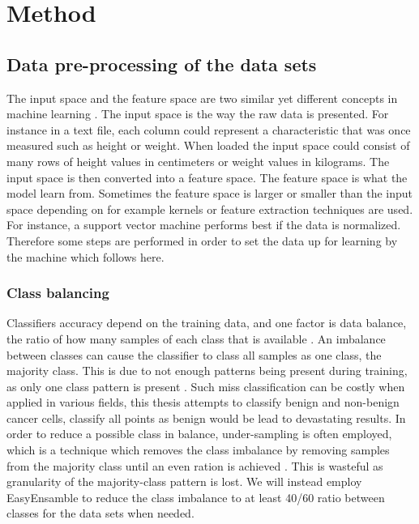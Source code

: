 \documentclass[a4paper,twoside]{bth}
\begin{document}
\chapter{Method}

\section{Data pre-processing of the data sets}

The input space and the feature space are two similar yet different concepts in machine learning \cite{Flach:2012:MLA:2490546}. The input space is the way the raw data is presented. For instance in a text file, each column could represent a characteristic that was once measured such as height or weight. When loaded the input space could consist of many rows of height values in centimeters or weight values in kilograms. The input space is then converted into a feature space. The feature space is what the model learn from. Sometimes the feature space is larger or smaller than the input space depending on for example kernels or feature extraction techniques are used. For instance, a support vector machine performs best if the data is normalized. Therefore some steps are performed in order to set the data up for learning by the machine which follows here.

\subsection{Class balancing}
Classifiers accuracy depend on the training data, and one factor is data balance, the ratio of how many samples of each class that is available \cite{Chawla:2004:ESI:1007730.1007733}. An imbalance between classes can cause the classifier to class all samples as one class, the majority class. This is due to not enough patterns being present during training, as only one class pattern is present \cite{Chawla:2004:ESI:1007730.1007733}. Such miss classification can be costly when applied in various fields, this thesis attempts to classify benign and non-benign cancer cells, classify all points as benign would be lead to devastating results. In order to reduce a possible class in balance, under-sampling is often employed, which is a technique which removes the class imbalance by removing samples from the majority class until an even ration is achieved \cite{ensamble}. This is wasteful as granularity of the majority-class pattern is lost. We will instead employ EasyEnsamble to reduce the class imbalance to at least 40/60 ratio between classes for the data sets when needed.
\end{document}
